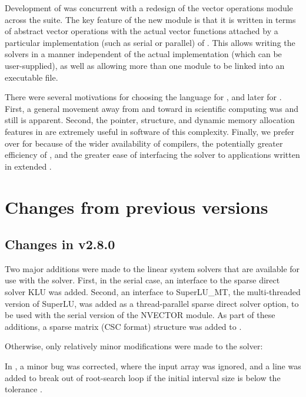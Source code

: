 Development of {\cvodes} was concurrent with a redesign of the vector
operations module across the {\sundials} suite. The key feature of the
new {\nvector} module is that it is written in terms of abstract
vector operations with the actual vector functions attached by a
particular implementation (such as serial or parallel) of
{\nvector}. This allows writing the {\sundials} solvers in a manner
independent of the actual {\nvector} implementation (which can be
user-supplied), as well as allowing more than one {\nvector} module to
be linked into an executable file.

 There were
several motivations for choosing the {\C} language for {\cvode}, and
later for {\cvodes}.  First, a general movement away from {\F} and
toward {\C} in scientific computing was and still is apparent.
Second, the pointer, structure, and dynamic memory allocation features
in {\C} are extremely useful in software of this complexity.  Finally,
we prefer {\C} over {\CPP} for {\cvodes} because of the wider
availability of {\C} compilers, the potentially greater efficiency of
{\C}, and the greater ease of interfacing the solver to applications
written in extended {\F}.  

\section{Changes from previous versions}

\subsection*{Changes in v2.8.0}

Two major additions were made to the linear system solvers that are
available for use with the {\cvodes} solver.  First, in the serial case,
an interface to the sparse direct solver KLU was added.
Second, an interface to SuperLU\_MT, the multi-threaded version of
SuperLU, was added as a thread-parallel sparse direct solver option,
to be used with the serial version of the NVECTOR module.
As part of these additions, a sparse matrix (CSC format) structure 
was added to {\cvodes}.

Otherwise, only relatively minor modifications were made to the
{\cvodes} solver:

In , a minor bug was corrected, where the input
array  was ignored, and a line was added to break out of
root-search loop if the initial interval size is below the tolerance
.

